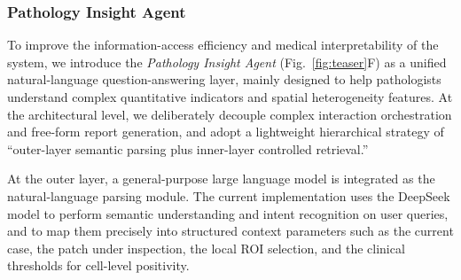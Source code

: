\documentclass[journal]{vgtc}                     %
\begin{document}
\subsubsection{Pathology Insight Agent}

To improve the information-access efficiency and medical interpretability of the system, we introduce the \textit{Pathology Insight Agent} (Fig.~\ref{fig:teaser}F) as a unified natural-language question-answering layer, mainly designed to help pathologists understand complex quantitative indicators and spatial heterogeneity features. At the architectural level, we deliberately decouple complex interaction orchestration and free-form report generation, and adopt a lightweight hierarchical strategy of ``outer-layer semantic parsing plus inner-layer controlled retrieval.''

At the outer layer, a general-purpose large language model is integrated as the natural-language parsing module. The current implementation uses the DeepSeek model to perform semantic understanding and intent recognition on user queries, and to map them precisely into structured context parameters such as the current case, the patch under inspection, the local ROI selection, and the clinical thresholds for cell-level positivity.
\end{document}

